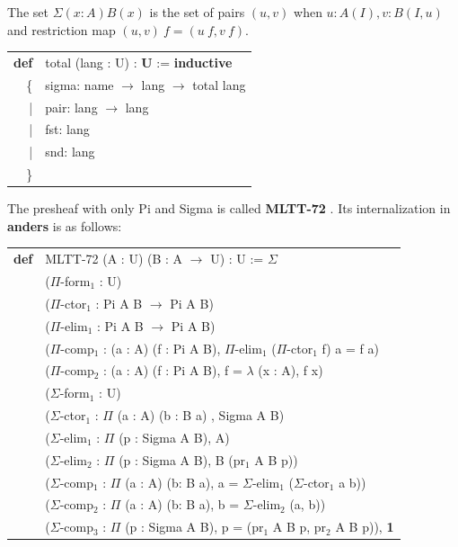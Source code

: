 \documentclass[a4paper,UKenglish,cleveref, autoref, thm-restate]{lipics-v2021}
\newcommand{\tabstyle}[0]{\scriptsize\ttfamily\fontseries{l}\selectfont}
\begin{document}
\begin{definition}[Sigma]
The set $\Sigma(x:A)B(x)$ is the set of pairs $(u,v)$ when $u:A(I),v:B(I,u)$ and restriction map $(u,v)\ f=(u\ f,v\ f)$.
\end{definition}
\begin{table}[ht!]
\tabstyle
\begin{tabular}{rl}
  \textbf{def} & total (lang : U) : \textbf{U} := \textbf{inductive} \\
            \{ & sigma: name $\rightarrow$ lang $\rightarrow$ total lang \\
             | & pair: lang $\rightarrow$ lang \\
             | & fst: lang \\
             | & snd: lang \\
            \} & \\
\end{tabular}
\end{table}

The presheaf with only Pi and Sigma is called \textbf{MLTT-72} \cite{MLTT72}. Its internalization in \textbf{anders} is as follows:

\begin{table}[ht!]
\tabstyle
\begin{tabular}{rl}
\textbf{def} & MLTT-72 (A : U) (B : A $\rightarrow$ U) : U := $\Sigma$ \\
             & ($\Pi$-form$_1$ : U) \\
             & ($\Pi$-ctor$_1$ : Pi A B $\rightarrow$ Pi A B) \\
             & ($\Pi$-elim$_1$ : Pi A B $\rightarrow$ Pi A B) \\
             & ($\Pi$-comp$_1$ : (a : A) (f : Pi A B), $\Pi$-elim$_1$ ($\Pi$-ctor$_1$ f) a = f a) \\
             & ($\Pi$-comp$_2$ : (a : A) (f : Pi A B), f = $\lambda$ (x : A), f x) \\
             & ($\Sigma$-form$_1$ : U) \\
             & ($\Sigma$-ctor$_1$ : $\Pi$ (a : A) (b : B a) , Sigma A B) \\
             & ($\Sigma$-elim$_1$ : $\Pi$ (p : Sigma A B), A) \\
             & ($\Sigma$-elim$_2$ : $\Pi$ (p : Sigma A B), B (pr$_1$ A B p)) \\
             & ($\Sigma$-comp$_1$ : $\Pi$ (a : A) (b: B a), a = $\Sigma$-elim$_1$ ($\Sigma$-ctor$_1$ a b)) \\
             & ($\Sigma$-comp$_2$ : $\Pi$ (a : A) (b: B a), b = $\Sigma$-elim$_2$ (a, b)) \\
             & ($\Sigma$-comp$_3$ : $\Pi$ (p : Sigma A B), p = (pr$_1$ A B p, pr$_2$ A B p)), \textbf{1}
\end{tabular}
\end{table}
\end{document}
